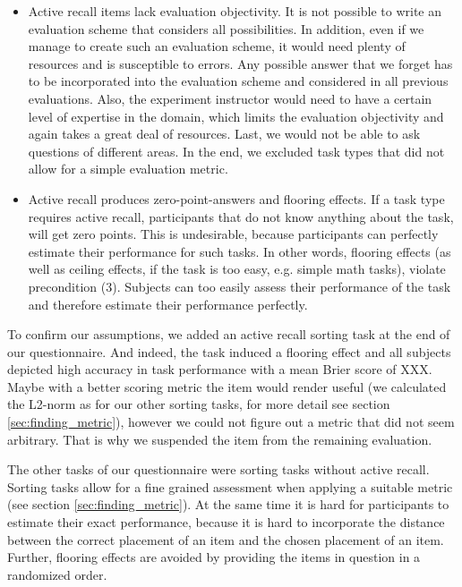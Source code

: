 \documentclass[../main/main.tex]{subfiles}
\begin{document}
	\begin{itemize}
		
		\item Active recall items lack evaluation objectivity. It is not possible to write an evaluation scheme that considers all possibilities. In addition, even if we manage to create such an evaluation scheme, it would need plenty of resources and is susceptible to errors. Any possible answer that we forget has to be incorporated into the evaluation scheme and considered in all previous evaluations. Also, the experiment instructor would need to have a certain level of expertise in the domain, which limits the evaluation objectivity and again takes a great deal of resources. Last, we would not be able to ask questions of different areas. In the end, we excluded task types that did not allow for a simple evaluation metric.
		
		\item Active recall produces zero-point-answers and flooring effects. If a task type requires active recall, participants that do not know anything about the task, will get zero points. This is undesirable, because participants can perfectly estimate their performance for such tasks. In other words, flooring effects (as well as ceiling effects, if the task is too easy, e.g. simple math tasks), violate precondition (3). Subjects can too easily assess their performance of the task and therefore estimate their performance perfectly.
	\end{itemize}
	
	\noindent To confirm our assumptions, we added an active recall sorting task at the end of our questionnaire. And indeed, the task induced a flooring effect and all subjects depicted high accuracy in task performance with a mean Brier score of XXX. Maybe with a better scoring metric the item would render useful (we calculated the L2-norm as for our other sorting tasks, for more detail see section \ref{sec:finding_metric}), however we could not figure out a metric that did not seem arbitrary. That is why we suspended the item from the remaining evaluation.
	
	The other tasks of our questionnaire were sorting tasks without active recall. Sorting tasks allow for a fine grained assessment when applying a suitable metric (see section \ref{sec:finding_metric}). At the same time it is hard for participants to estimate their exact performance, because it is hard to incorporate the distance between the correct placement of an item and the chosen placement of an item. Further, flooring effects are avoided by providing the items in question in a randomized order.
	
\end{document}
